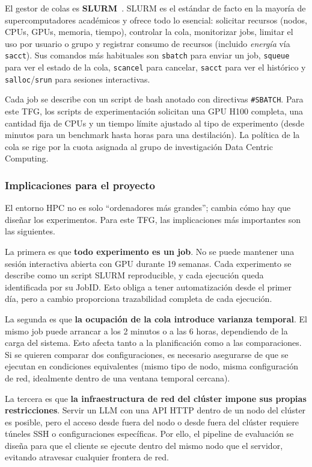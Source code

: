 \documentclass[11pt,a4paper]{article}
\begin{document}
El gestor de colas es \textbf{SLURM}~\cite{slurm}. SLURM es el estándar de facto en la mayoría de supercomputadores académicos y ofrece todo lo esencial: solicitar recursos (nodos, CPUs, GPUs, memoria, tiempo), controlar la cola, monitorizar jobs, limitar el uso por usuario o grupo y registrar consumo de recursos (incluido \textit{energía} vía \texttt{sacct}). Sus comandos más habituales son \texttt{sbatch} para enviar un job, \texttt{squeue} para ver el estado de la cola, \texttt{scancel} para cancelar, \texttt{sacct} para ver el histórico y \texttt{salloc}/\texttt{srun} para sesiones interactivas.

Cada job se describe con un script de bash anotado con directivas \texttt{\#SBATCH}. Para este TFG, los scripts de experimentación solicitan una GPU H100 completa, una cantidad fija de CPUs y un tiempo límite ajustado al tipo de experimento (desde minutos para un benchmark hasta horas para una destilación). La política de la cola se rige por la cuota asignada al grupo de investigación Data Centric Computing.

\subsubsection{Implicaciones para el proyecto}

El entorno HPC no es solo ``ordenadores más grandes''; cambia cómo hay que diseñar los experimentos. Para este TFG, las implicaciones más importantes son las siguientes.

La primera es que \textbf{todo experimento es un job}. No se puede mantener una sesión interactiva abierta con GPU durante 19 semanas. Cada experimento se describe como un script SLURM reproducible, y cada ejecución queda identificada por su JobID. Esto obliga a tener automatización desde el primer día, pero a cambio proporciona trazabilidad completa de cada ejecución.

La segunda es que \textbf{la ocupación de la cola introduce varianza temporal}. El mismo job puede arrancar a los 2 minutos o a las 6 horas, dependiendo de la carga del sistema. Esto afecta tanto a la planificación como a las comparaciones. Si se quieren comparar dos configuraciones, es necesario asegurarse de que se ejecutan en condiciones equivalentes (mismo tipo de nodo, misma configuración de red, idealmente dentro de una ventana temporal cercana).

La tercera es que \textbf{la infraestructura de red del clúster impone sus propias restricciones}. Servir un LLM con una API HTTP dentro de un nodo del clúster es posible, pero el acceso desde fuera del nodo o desde fuera del clúster requiere túneles SSH o configuraciones específicas. Por ello, el pipeline de evaluación se diseña para que el cliente se ejecute dentro del mismo nodo que el servidor, evitando atravesar cualquier frontera de red.
\end{document}
